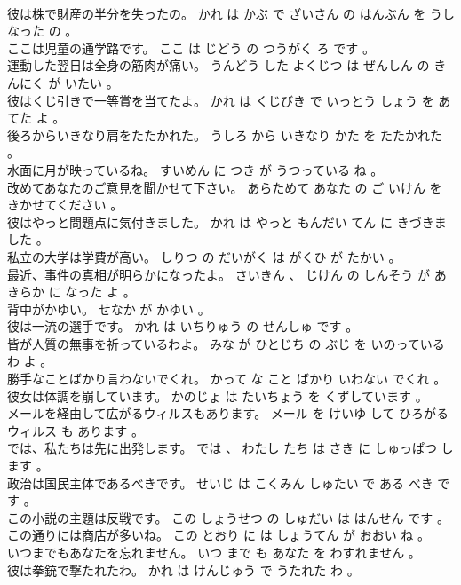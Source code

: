 \documentclass[8pt]{extreport}
\begin{document}
\begin{CJK}{UTF8}{min}
\\	彼は株で財産の半分を失ったの。	かれ は かぶ で ざいさん の はんぶん を うしなった の 。 
\\	ここは児童の通学路です。	ここ は じどう の つうがく ろ です 。 
\\	運動した翌日は全身の筋肉が痛い。	うんどう した よくじつ は ぜんしん の きんにく が いたい 。 
\\	彼はくじ引きで一等賞を当てたよ。	かれ は くじびき で いっとう しょう を あてた よ 。 
\\	後ろからいきなり肩をたたかれた。	うしろ から いきなり かた を たたかれた 。 
\\	水面に月が映っているね。	すいめん に つき が うつっている ね 。 
\\	改めてあなたのご意見を聞かせて下さい。	あらためて あなた の ご いけん を きかせてください 。 
\\	彼はやっと問題点に気付きました。	かれ は やっと もんだい てん に きづきました 。 
\\	私立の大学は学費が高い。	しりつ の だいがく は がくひ が たかい 。 
\\	最近、事件の真相が明らかになったよ。	さいきん 、 じけん の しんそう が あきらか に なった よ 。 
\\	背中がかゆい。	せなか が かゆい 。 
\\	彼は一流の選手です。	かれ は いちりゅう の せんしゅ です 。 
\\	皆が人質の無事を祈っているわよ。	みな が ひとじち の ぶじ を いのっている わ よ 。 
\\	勝手なことばかり言わないでくれ。	かって な こと ばかり いわない でくれ 。 
\\	彼女は体調を崩しています。	かのじょ は たいちょう を くずしています 。 
\\	メールを経由して広がるウィルスもあります。	メール を けいゆ して ひろがる ウィルス も あります 。 
\\	では、私たちは先に出発します。	では 、 わたし たち は さき に しゅっぱつ します 。 
\\	政治は国民主体であるべきです。	せいじ は こくみん しゅたい で ある べき です 。 
\\	この小説の主題は反戦です。	この しょうせつ の しゅだい は はんせん です 。 
\\	この通りには商店が多いね。	この とおり に は しょうてん が おおい ね 。 
\\	いつまでもあなたを忘れません。	いつ まで も あなた を わすれません 。 
\\	彼は拳銃で撃たれたわ。	かれ は けんじゅう で うたれた わ 。 

\end{CJK}
\end{document}
